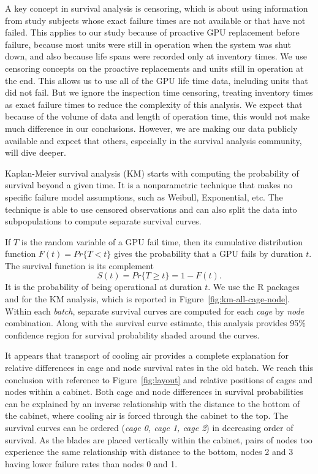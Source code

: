 A key concept in survival analysis is censoring, which is about using
information from study subjects whose exact failure times are not
available or that have not failed. This applies to our study because
of proactive GPU replacement before failure, because most units were
still in operation when the system was shut down, and also because
life spans were recorded only at inventory times. We use censoring
concepts on the proactive replacements and units still in operation at
the end. This allows us to use all of the GPU life time data,
including units that did not fail. But we ignore the inspection time
censoring, treating inventory times as exact failure times to reduce
the complexity of this analysis. We expect that because of the volume
of data and length of operation time, this would not make much
difference in our conclusions. However, we are making our data
publicly available and expect that others, especially in the survival
analysis community, will dive deeper.

Kaplan-Meier survival analysis (KM) starts with computing the
probability of survival beyond a given time. It is a nonparametric
technique that makes no specific failure model assumptions, such as
Weibull, Exponential, etc. The technique is able to use censored
observations and can also split the data into subpopulations to
compute separate survival curves.

If $T$ is the random variable of a GPU fail time, then its cumulative
distribution function $F(t) = Pr\{T < t\}$ gives the probability that
a GPU fails by duration $t$. The survival function is its complement
\begin{displaymath}
  S(t) = Pr\{T \geq t\} = 1 - F(t).
\end{displaymath}
It is the probability of being operational at duration $t$.  We use
the R packages  and  for the KM analysis,
which is reported in Figure~\ref{fig:km-all-cage-node}. Within each
{\em batch}, separate survival curves are computed for each {\em cage}
by {\em node} combination. Along with the survival curve estimate,
this analysis provides 95\% confidence region for survival probability
shaded around the curves.

It appears that transport of cooling air provides a complete
explanation for relative differences in cage and node survival rates
in the old batch.  We reach this conclusion with reference to
Figure~\ref{fig:layout} and relative positions of cages and nodes
within a cabinet. Both cage and node differences in survival
probabilities can be explained by an inverse relationship with the
distance to the bottom of the cabinet, where cooling air is forced
through the cabinet to the top. The survival curves can be ordered
({\em cage 0, cage 1, cage 2}) in decreasing order of survival. As the
blades are placed vertically within the cabinet, pairs of nodes too
experience the same relationship with distance to the bottom, nodes 2
and 3 having lower failure rates than nodes 0 and 1.


